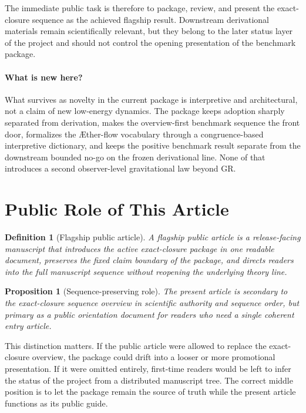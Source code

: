 \documentclass[11pt]{article}
\newcommand{\Aflow}{\AE{}ther-flow}
\newtheorem{definition}{Definition}
\newtheorem{proposition}{Proposition}
\begin{document}
The immediate public task is therefore to package, review, and present the exact-closure sequence as the achieved flagship result. Downstream derivational materials remain scientifically relevant, but they belong to the later status layer of the project and should not control the opening presentation of the benchmark package.

\paragraph{What is new here?}
What survives as novelty in the current package is interpretive and architectural, not a claim of new low-energy dynamics. The package keeps adoption sharply separated from derivation, makes the overview-first benchmark sequence the front door, formalizes the \Aflow{} vocabulary through a congruence-based interpretive dictionary, and keeps the positive benchmark result separate from the downstream bounded no-go on the frozen derivational line. None of that introduces a second observer-level gravitational law beyond GR.



\section{Public Role of This Article}

\begin{definition}[Flagship public article]
A flagship public article is a release-facing manuscript that introduces the active exact-closure package in one readable document, preserves the fixed claim boundary of the package, and directs readers into the full manuscript sequence without reopening the underlying theory line.
\end{definition}

\begin{proposition}[Sequence-preserving role]
The present article is secondary to the exact-closure sequence overview in scientific authority and sequence order, but primary as a public orientation document for readers who need a single coherent entry article.
\end{proposition}

This distinction matters. If the public article were allowed to replace the exact-closure overview, the package could drift into a looser or more promotional presentation. If it were omitted entirely, first-time readers would be left to infer the status of the project from a distributed manuscript tree. The correct middle position is to let the package remain the source of truth while the present article functions as its public guide.
\end{document}
